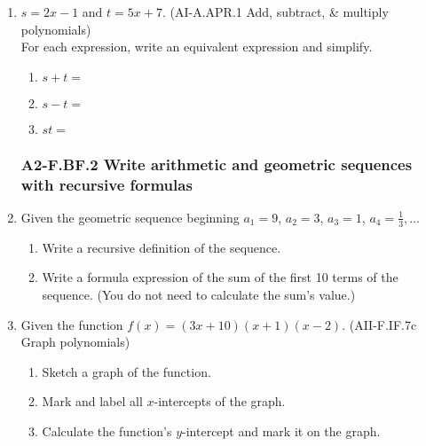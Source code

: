 \documentclass[12pt, twoside]{article}
\begin{document}
\begin{enumerate}
\item $s = 2x - 1 $ and $t = 5x + 7$. \hfill (AI-A.APR.1 Add, subtract, \& multiply polynomials) \\[0.5cm]
For each expression, write an equivalent expression and simplify.
    \begin{enumerate}[itemsep=0.75cm]
        \item $s+t =$
        \item $s-t =$
        \item $st =$
    \end{enumerate}

\newpage
\subsubsection*{A2-F.BF.2 Write arithmetic and geometric sequences with recursive formulas}
\item Given the geometric sequence beginning $a_1 = 9$, $a_2 = 3$, $a_3 = 1$, $a_4 = \frac{1}{3}, \ldots$      
    \begin{enumerate}[itemsep=2cm]
        \item Write a recursive definition of the sequence.
        \item Write a formula expression of the sum of the first 10 terms of the sequence. (You do not need to calculate the sum's value.)
    \end{enumerate}
    \vspace{2cm}

\item Given the function $f(x)=(3x+10)(x+1)(x-2)$. \hfill (AII-F.IF.7c Graph polynomials)
    \begin{center}
    \end{center}
    \begin{enumerate}
        \item Sketch a graph of the function.
        \item Mark and label all $x$-intercepts of the graph.
        \item Calculate the function's $y$-intercept and mark it on the graph.
    \end{enumerate}


\end{enumerate}
\end{document}
